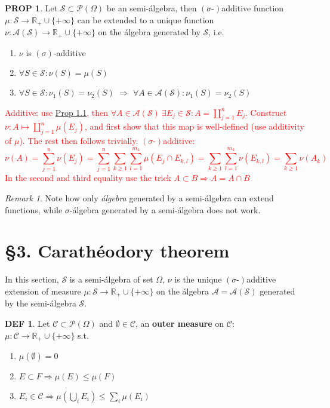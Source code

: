 \documentclass[hidelinks]{article}
\theoremstyle{definition}
\newtheorem*{defin}{DEF}
\theoremstyle{dotless}
\newtheorem{proposition}{PROP}[section]
\theoremstyle{remark}
\newtheorem*{remark}{Remark}
\begin{document}
\begin{proposition}
Let $\mathscr{S}\subset\mathscr{P}(\Omega)$ be an semi-álgebra, then $(\sigma\textrm{-})$additive function $\mu: \mathscr{S}\to \mathbb{R}_+\cup\{+\infty\}$ can be extended to a unique function $\nu: \mathscr{A}(\mathscr{S})\to \mathbb{R}_+\cup\{+\infty\}$ on the álgebra generated by $\mathscr{S}$, i.e.
\begin{enumerate}[label=\arabic*\degree]
    \item $\nu$ is $(\sigma)$-additive
    \item $\forall S\in\mathscr{S}:\nu(S)=\mu(S)$
    \item $\forall S\in\mathscr{S}:\nu_1(S)=\nu_2(S)$ $\Rightarrow$ $\forall A\in\mathscr{A}(\mathscr{S}):\nu_1(S)=\nu_2(S)$
\end{enumerate}
\end{proposition}
\textcolor{red}{Additive: use \hyperref[Prop 1.1]{Prop 1.1}, then $\forall A\in\mathscr{A}(\mathscr{S})\ \exists E_j\in\mathscr{S}:A=\coprod_{j=1}^nE_j$. Construct $\nu:A\mapsto\coprod_{j=1}^n\mu(E_j)$, and first show that this map is well-defined (use additivity of $\mu$). The rest then follows trivially.\smallbreak
$(\sigma\textrm{-})$additive:
\[\nu(A)=\sum_{j=1}^n\nu(E_j)=\sum_{j=1}^n\sum_{k\geq1}\sum_{l=1}^{m_k}\mu(E_j\cap E_{k,l})=\sum_{k\geq1}\sum_{l=1}^{m_k}\nu(E_{k,l})=\sum_{k\geq1}\nu(A_k)\]
In the second and third equality use the trick $A\subset B\Rightarrow A=A\cap B$}

\begin{remark}
Note how only \emph{álgebra} generated by a semi-álgebra can extend functions, while $\sigma$-álgebra generated by a semi-álgebra does not work.
\end{remark}

\newpage
\section*{\S3. Carathéodory theorem}
\setcounter{section}{3}
In this section, $\mathscr{S}$ is a semi-álgebra of set $\Omega$, $\nu$ is the unique $(\sigma\textrm{-})$additive extension of measure $\mu:\mathscr{S}\to\mathbb{R}_+\cup\{+\infty\}$ on the álgebra $\mathscr{A}=\mathscr{A}(\mathscr{S})$ generated by the semi-álgebra $\mathscr{S}$.

\begin{defin}
Let $\mathscr{C}\subset\mathscr{P}(\Omega)$ and $\emptyset\in\mathscr{C}$, an \textbf{outer measure} on $\mathscr{C}$: $\mu:\mathscr{C}\to\mathbb{R}_+\cup\{+\infty\}$ s.t.\begin{enumerate}[label=\arabic*\degree]
    \item $\mu(\emptyset)=0$
    \item $E\subset F\Rightarrow\mu(E)\leq\mu(F)$
    \item $E_i\in\mathscr{C}\Rightarrow\mu(\bigcup\limits_iE_i)\leq\sum\limits_i\mu(E_i)$
\end{enumerate}
\end{defin}
\end{document}
